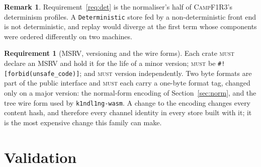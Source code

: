 \documentclass[11pt,a4paper]{article}
\newcommand{\code}[1]{\texttt{#1}}
\newcommand{\Camp}{\textsc{CampF1R3}}
\newcommand{\MUST}{\textsc{must}}
\theoremstyle{definition}
\newtheorem{requirement}[definition]{Requirement}
\newtheorem{remark}[definition]{Remark}
\theoremstyle{plain}
\begin{document}
\begin{remark}
Requirement~\ref{req:det} is the normaliser's half of \Camp's determinism
profiles. A \code{Deterministic} store fed by a non-deterministic front end is
not deterministic, and replay would diverge at the first term whose components
were ordered differently on two machines.
\end{remark}

\begin{requirement}[MSRV, versioning and the wire forms]
Each crate \MUST{} declare an MSRV and hold it for the life of a minor version;
\MUST{} be \code{\#![forbid(unsafe\_code)]}; and \MUST{} version independently.
Two byte formats are part of the public interface and \MUST{} each carry a
one-byte format tag, changed only on a major version: the normal-form encoding
of Section~\ref{sec:norm}, and the tree wire form used by
\code{k1ndl1ng-wasm}. A change to the encoding changes every content hash, and
therefore every channel identity in every store built with it; it is the most
expensive change this family can make.
\end{requirement}

\section{Validation}\label{sec:testing}
\end{document}
